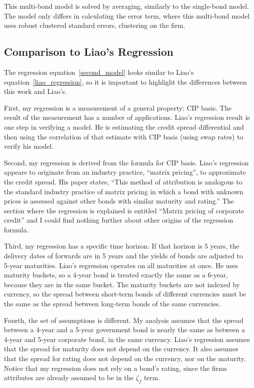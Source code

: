 This multi-bond model is solved by averaging, similarly to the single-bond model.  The model only differs in calculating the error term, where this multi-bond model uses robust clustered standard errors, clustering on the firm.



\subsection{Comparison to Liao's Regression}

The regression equation~\eqref{second_model} looks similar to Liao's equation~\eqref{liao_regression}, so it is important to highlight the differences between this work and Liao's.

First, my regression is a measurement of a general property: CIP basis.  The result of the measurement has a number of applications.  Liao's regression result is one step in verifying a model.  He is estimating the credit spread differential and then using the correlation of that estimate with CIP basis (using swap rates) to verify his model.  

Second, my regression is derived from the formula for CIP basis.  Liao's regression appears to originate from an industry practice, ``matrix pricing'', to approximate the credit spread.  His paper states, ``This method of attribution is analogous to the standard industry practice of matrix pricing in which a bond with unknown prices is assessed against other bonds with similar maturity and rating.''  The section where the regression is explained is entitled ``Matrix pricing of corporate credit'' and I could find nothing further about other origins of the regression formula.

Third, my regression has a specific time horizon.  If that horizon is 5 years, the delivery dates of forwards are in 5 years and the yields of bonds are adjusted to 5-year maturities.  Liao's regression operates on all maturities at once.  He uses maturity buckets, so a 4-year bond is treated exactly the same as a 6-year, because they are in the same bucket.  The maturity buckets are not indexed by currency, so the spread between short-term bonds of different currencies must be the same as the spread between long-term bonds of the same currencies.

Fourth, the set of assumptions is different.  My analysis assumes that the spread between a 4-year and a 5-year government bond is nearly the same as between a 4-year and 5-year corporate bond, in the same currency.  Liao's regression assumes that the spread for maturity does not depend on the currency.  It also assumes that the spread for rating does not depend on the currency, nor on the maturity.  Notice that my regression does not rely on a bond's rating, since the firms attributes are already assumed to be in the $\zeta_f$ term.

